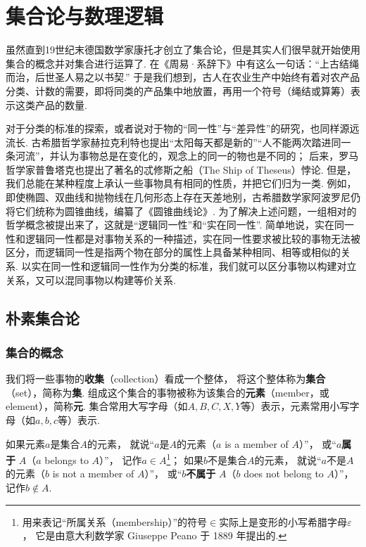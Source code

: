 \chapter{集合论与数理逻辑}
虽然直到19世纪末德国数学家康托才创立了集合论，但是其实人们很早就开始使用集合的概念并对集合进行运算了.
在《周易·系辞下》中有这么一句话：“上古结绳而治，后世圣人易之以书契.”
于是我们想到，古人在农业生产中始终有着对农产品分类、计数的需要，即将同类的产品集中地放置，再用一个符号（绳结或算筹）表示这类产品的数量.

对于分类的标准的探索，或者说对于物的“同一性”与“差异性”的研究，也同样源远流长.
古希腊哲学家赫拉克利特也提出“太阳每天都是新的”“人不能两次踏进同一条河流”，并认为事物总是在变化的，观念上的同一的物也是不同的；
后来，罗马哲学家普鲁塔克也提出了著名的忒修斯之船（The Ship of Theseus）悖论.
但是，我们总能在某种程度上承认一些事物具有相同的性质，并把它们归为一类.
例如，即使椭圆、双曲线和抛物线在几何形态上存在天差地别，古希腊数学家阿波罗尼仍将它们统称为圆锥曲线，编纂了《圆锥曲线论》.
为了解决上述问题，一组相对的哲学概念被提出来了，这就是“逻辑同一性”和“实在同一性”.
简单地说，实在同一性和逻辑同一性都是对事物关系的一种描述，实在同一性要求被比较的事物无法被区分，而逻辑同一性是指两个物在部分的属性上具备某种相同、相等或相似的关系.
以实在同一性和逻辑同一性作为分类的标准，我们就可以区分事物以构建对立关系，又可以混同事物以构建等价关系.

\section{朴素集合论}
\subsection{集合的概念}
\begin{definition}
我们将一些事物的\textbf{收集}（collection）看成一个整体，%
将这个整体称为\textbf{集合}（set），简称为\textbf{集}.
组成这个集合的事物被称为该集合的\textbf{元素}（member，或element），简称\textbf{元}.
集合常用大写字母（如\(A,B,C,X,Y\)等）表示，元素常用小写字母（如\(a,b,c\)等）表示.

如果元素\(a\)是集合\(A\)的元素，%
就说“\(a\)是\(A\)的元素（\(a\) is a member of \(A\)）”，%
或“\(a\)\textbf{属于} \(A\)（\(a\) belongs to \(A\)）”，%
记作\(a \in A\)\footnote{%
用来表记“所属关系（membership）”的符号\(\in\)实际上是变形的小写希腊字母\(\varepsilon\)，%
它是由意大利数学家 Giuseppe Peano 于 1889 年提出的.
}；
如果\(b\)不是集合\(A\)的元素，%
就说“\(a\)不是\(A\)的元素（\(b\) is not a member of \(A\)）”，%
或“\(b\)\textbf{不属于} \(A\)（\(b\) does not belong to \(A\)）”，%
记作\(b \notin A\).
\end{definition}

